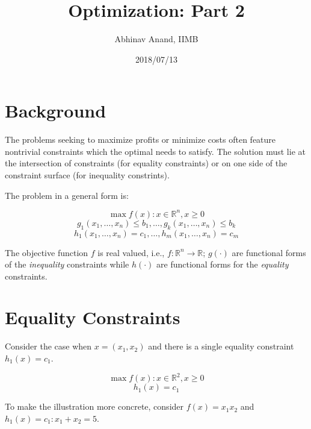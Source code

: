 \documentclass[11pt,]{article}
\title{Optimization: Part 2}
\author{Abhinav Anand, IIMB}
\date{2018/07/13}
\begin{document}
\maketitle

\section{Background}\label{background}

The problems seeking to maximize profits or minimize costs often feature
nontrivial constraints which the optimal needs to satisfy. The solution
must lie at the intersection of constraints (for equality constraints)
or on one side of the constraint surface (for inequality constrints).

The problem in a general form is:

\[
\max f(x): x\in \mathbb{R}^n, x\geq 0
\] \[
g_1(x_1,\hdots,x_n)\leq b_1,\hdots,g_k(x_1,\hdots,x_n)\leq b_k
\] \[
h_1(x_1,\hdots,x_n)= c_1,\hdots,h_m(x_1,\hdots,x_n)= c_m
\]

The objective function \(f\) is real valued, i.e.,
\(f:\mathbb{R}^n \to \mathbb{R}\); \(g(\cdot)\) are functional forms of
the \emph{inequality} constraints while \(h(\cdot)\) are functional
forms for the \emph{equality} constraints.

\section{Equality Constraints}\label{equality-constraints}

Consider the case when \(x=(x_1, x_2)\) and there is a single equality
constraint \(h_1(x) = c_1\).

\[
\max f(x): x\in \mathbb{R}^2, x\geq 0
\] \[
h_1(x) = c_1
\]

To make the illustration more concrete, consider \(f(x) = x_1x_2\) and
\(h_1(x)=c_1:x_1+ x_2=5\).
\end{document}
